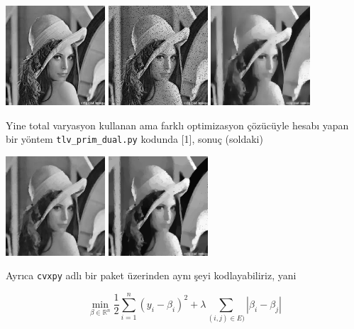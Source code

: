 \documentclass[12pt,fleqn]{article}\usepackage{../../common}
\begin{document}
\includegraphics[width=10em]{lenad0.jpg}
\includegraphics[width=10em]{lenad1.jpg}
\includegraphics[width=10em]{lenad2.jpg}

Yine total varyasyon kullanan ama farklı optimizasyon çözücüyle hesabı
yapan bir yöntem \verb!tlv_prim_dual.py! kodunda [1], sonuç (soldaki)

\includegraphics[width=10em]{lenad3.jpg}
\includegraphics[width=10em]{lenad4.jpg}

Ayrıca \verb!cvxpy! adlı bir paket üzerinden aynı şeyi kodlayabiliriz, yani 

$$
\min_{\beta \in \mathbb{R}^n} 
\frac{1}{2} \sum _{i=1}^{n} (y_i - \beta_i)^2 + 
\lambda \sum _{(i,j) \in E)}  |\beta_i - \beta_j|
$$
\end{document}
